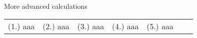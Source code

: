 \begin{exercises}{  More advanced calculations }
\begin{enumerate}[noitemsep, label=\textbf{\arabic*}. ]
\end{enumerate}
\practiceinfo
\par 
 \par \begin{tabular}[h]{cccccc}
 (1.) aaa  &  (2.) aaa  &  (3.) aaa  &  (4.) aaa  &  (5.) aaa  &    &   & \end{tabular}
\end{exercises}
